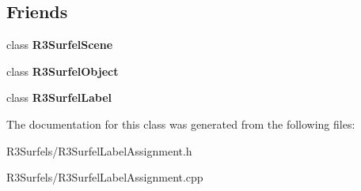 \subsection*{Friends}
\begin{DoxyCompactItemize}
\item 
class {\bfseries R3\+Surfel\+Scene}\hypertarget{class_r3_surfel_label_assignment_af9bb32c0eac7d1d54787bbc6b44586b6}{}\label{class_r3_surfel_label_assignment_af9bb32c0eac7d1d54787bbc6b44586b6}

\item 
class {\bfseries R3\+Surfel\+Object}\hypertarget{class_r3_surfel_label_assignment_a850b1452c6e8af94bc02cc26bd2e5fe8}{}\label{class_r3_surfel_label_assignment_a850b1452c6e8af94bc02cc26bd2e5fe8}

\item 
class {\bfseries R3\+Surfel\+Label}\hypertarget{class_r3_surfel_label_assignment_a5f8429227744e4e08e5a44a3fcba527f}{}\label{class_r3_surfel_label_assignment_a5f8429227744e4e08e5a44a3fcba527f}

\end{DoxyCompactItemize}


The documentation for this class was generated from the following files\+:\begin{DoxyCompactItemize}
\item 
R3\+Surfels/R3\+Surfel\+Label\+Assignment.\+h\item 
R3\+Surfels/R3\+Surfel\+Label\+Assignment.\+cpp\end{DoxyCompactItemize}
